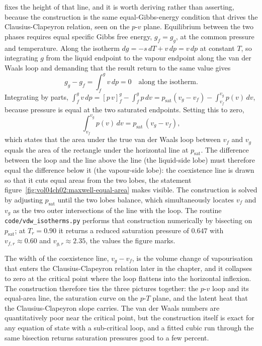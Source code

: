  fixes the height of that line,
and it is worth deriving rather than asserting, because the construction is
the same equal-Gibbs-energy condition that drives the Clausius-Clapeyron
relation, seen on the $p$-$v$ plane. Equilibrium between the two phases
requires equal specific Gibbs free energy, $g_f = g_g$, at the common
pressure and temperature. Along the isotherm $dg = -s\,dT + v\,dp = v\,dp$
at constant $T$, so integrating $g$ from the liquid endpoint to the vapour
endpoint along the van der Waals loop and demanding that the result return
to the same value gives
\[
g_g - g_f = \int_{f}^{g} v\,dp = 0
\quad\text{along the isotherm.}
\]
Integrating by parts, $\int_f^g v\,dp = [p\,v]_f^g - \int_f^g p\,dv =
p_{\text{sat}}(v_g - v_f) - \int_{v_f}^{v_g} p(v)\,dv$, because pressure is
equal at the two saturated endpoints. Setting this to zero,
\[
\int_{v_f}^{v_g} p(v)\,dv = p_{\text{sat}}\,(v_g - v_f),
\]
which states that the area under the true van der Waals loop between $v_f$
and $v_g$ equals the area of the rectangle under the horizontal line at
$p_{\text{sat}}$. The difference between the loop and the line above the
line (the liquid-side lobe) must therefore equal the difference below it
(the vapour-side lobe): the coexistence line is drawn so that it cuts equal
areas from the two lobes, the statement
figure~\ref{fig:vol04ch02:maxwell-equal-area} makes visible. The
construction is solved by adjusting $p_{\text{sat}}$ until the two lobes
balance, which simultaneously locates $v_f$ and $v_g$ as the two outer
intersections of the line with the loop. The routine
\texttt{code/vdw\_isotherms.py} performs that construction numerically by
bisecting on $p_{\text{sat}}$; at $T_r = 0.90$ it returns a reduced
saturation pressure of $0.647$ with $v_{f,r} \approx 0.60$ and $v_{g,r}
\approx 2.35$, the values the figure marks.



The width of the coexistence line, $v_g - v_f$, is the volume change of
vapourisation that enters the Clausius-Clapeyron relation later in the
chapter, and it collapses to zero at the critical point where the loop
flattens into the horizontal inflexion. The construction therefore ties the
three pictures together: the $p$-$v$ loop and its equal-area line, the
saturation curve on the $p$-$T$ plane, and the latent heat that the
Clausius-Clapeyron slope carries. The van der Waals numbers are
quantitatively poor near the critical point, but the construction itself is
exact for any equation of state with a sub-critical loop, and a fitted cubic
run through the same bisection returns saturation pressures good to a few
percent.

